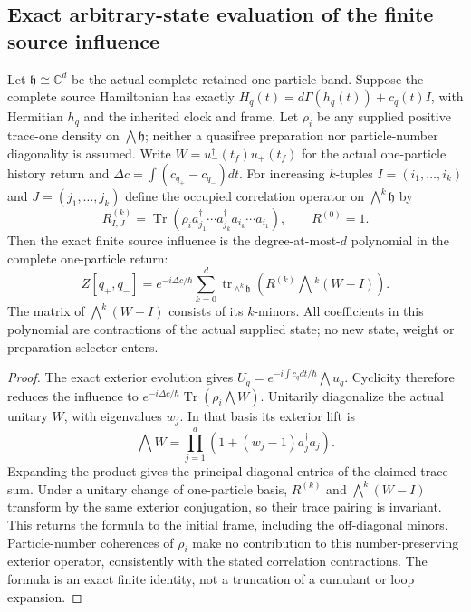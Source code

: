 \documentclass[12pt,a4paper]{article}
\begin{document}
\subsection{Exact arbitrary-state evaluation of the finite source influence}
\label{p4c:sec:v247-arbitrary-state-influence}
\begin{theorem}
\label{p4c:thm:v247-source-correlation-polynomial}
Let $\mathfrak h\cong\mathbb C^d$ be the actual complete retained
one-particle band. Suppose the complete source Hamiltonian has exactly
$H_q(t)=d\Gamma(h_q(t))+c_q(t)I$, with Hermitian $h_q$ and the
inherited clock and frame. Let $\rho_i$ be any supplied positive
trace-one density on $\bigwedge\mathfrak h$; neither a quasifree
preparation nor particle-number diagonality is assumed. Write
$W=u_-^\dagger(t_f)u_+(t_f)$ for the actual one-particle history return
and $\Delta c=\int(c_{q_+}-c_{q_-})dt$. For increasing $k$-tuples
$I=(i_1,\ldots,i_k)$ and $J=(j_1,\ldots,j_k)$ define the occupied
correlation operator on $\bigwedge^k\mathfrak h$ by
\[
 R^{(k)}_{I,J}
 =\operatorname{Tr}\!\left(\rho_i
 a_{j_1}^\dagger\cdots a_{j_k}^\dagger
 a_{i_k}\cdots a_{i_1}\right),\qquad R^{(0)}=1.
\]
Then the exact finite source influence is the degree-at-most-$d$
polynomial in the complete one-particle return:
\begin{equation}
 \boxed{Z[q_+,q_-]=e^{-i\Delta c/\hbar}
 \sum_{k=0}^d\operatorname{tr}_{\wedge^k\mathfrak h}
       \left(R^{(k)}\bigwedge\!{}^k(W-I)\right).}
 \label{p4c:eq:v247-source-correlation-polynomial}
\end{equation}
The matrix of $\bigwedge^k(W-I)$ consists of its $k$-minors.
All coefficients in this polynomial are contractions of the actual
supplied state; no new state, weight or preparation selector enters.
\end{theorem}
\begin{proof}
The exact exterior evolution gives
$U_q=e^{-i\int c_qdt/\hbar}\bigwedge u_q$.
Cyclicity therefore reduces the influence to
$e^{-i\Delta c/\hbar}\operatorname{Tr}(\rho_i\bigwedge W)$.
Unitarily diagonalize the actual unitary $W$, with eigenvalues $w_j$.
In that basis its exterior lift is
\[
 \bigwedge W=\prod_{j=1}^d(1+(w_j-1)a_j^\dagger a_j).
\]
Expanding the product gives the principal diagonal entries of the
claimed trace sum. Under a unitary change of one-particle basis,
$R^{(k)}$ and $\bigwedge^k(W-I)$ transform by the same exterior
conjugation, so their trace pairing is invariant. This returns the
formula to the initial frame, including the off-diagonal minors.
Particle-number coherences of $\rho_i$ make no contribution to this
number-preserving exterior operator, consistently with the stated
correlation contractions. The formula is an exact finite identity,
not a truncation of a cumulant or loop expansion.
\end{proof}
\end{document}
